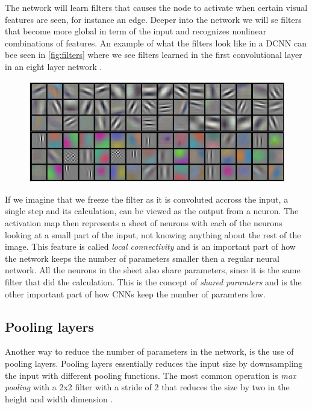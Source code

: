 The network will learn filters that causes the node to activate when certain visual features are seen, for instance an edge. Deeper into the network we will se filters that become more global in term of the input and recognizes nonlinear combinations of features. An example of what the filters look like in a DCNN can bee seen in \autoref{fig:filters} where we see filters learned in the first convolutional layer in an eight layer network \cite{Krizhevsky2012}.

\begin{figure}[H]
	\centering
	\includegraphics[width=\linewidth]{fig/filters.png}
	\label{fig:filters}
\end{figure}
If we imagine that we freeze the filter as it is convoluted accross the input, a single step and its calculation, can be viewed as the output from a neuron. The activation map then represents a sheet of neurons with each of the neurons looking at a small part of the input, not knowing anything about the rest of the image. This feature is called \emph{local connectivity} and is an important part of how the network keeps the number of parameters smaller then a regular neural network. All the neurons in the sheet also share parameters, since it is the same filter that did the calculation. This is the concept of \emph{shared paramters} and is the other important part of how CNNs keep the number of paramters low.

\subsection{Pooling layers}
Another way to reduce the number of parameters in the network, is the use of pooling layers. Pooling layers essentially reduces the input size by downsampling the input with different pooling functions. The most common operation is \emph{max pooling} with a 2x2 filter with a stride of 2 that reduces the size by two in the height and width dimension \cite{Li}. 






















